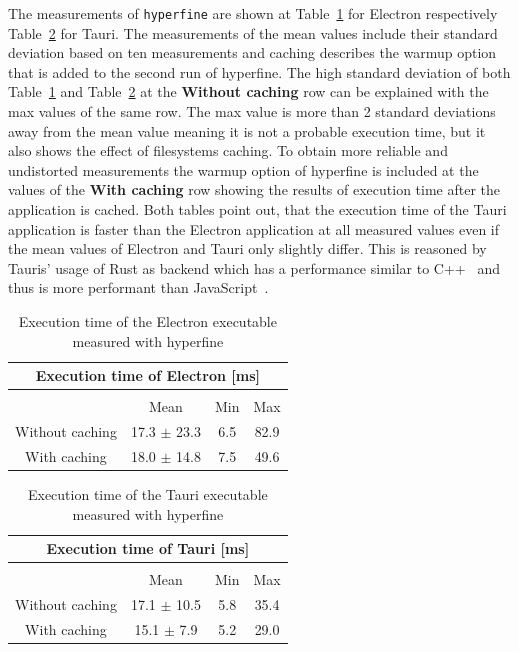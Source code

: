 The measurements of \texttt{hyperfine} are shown at Table~\ref{table:exec:electron} for Electron respectively Table~\ref{table:exec:tauri} for Tauri.
The measurements of the mean values include their standard deviation based on ten measurements and caching describes the warmup option that is added to the second run of hyperfine.
The high standard deviation of both Table~\ref{table:exec:electron} and Table~\ref{table:exec:tauri} at the \textbf{Without caching} row can be explained with the max values of the same row.
The max value is more than 2 standard deviations away from the mean value meaning it is not a probable execution time, but it also shows the effect of filesystems caching.
To obtain more reliable and undistorted measurements the warmup option of hyperfine is included at the values of the \textbf{With caching} row showing the results of execution time after the application is cached.
Both tables point out, that the execution time of the Tauri application is faster than the Electron application at all measured values even if the mean values of Electron and Tauri only slightly differ.
This is reasoned by Tauris' usage of Rust as backend which has a performance similar to C++~\cite{rustPerformance} and thus is more performant than JavaScript~\cite{C++Javascript}.

\begin{table}[h]
    \begin{tabular} {| c | c | c | c |}
        \hline
        \multicolumn{4}{|c|}{Execution time of Electron [ms]} \\ \hline
        \multicolumn{4}{|c|}{}\\ \hline
        & Mean   & Min & Max     \\ \hline
        Without caching & 17.3 $\pm$ 23.3 & 6.5 & 82.9  \\ \hline
        With caching & 18.0 $\pm$ 14.8 & 7.5 & 49.6 \\ \hline
    \end{tabular}
    \caption{\label{table:exec:electron} Execution time of the Electron executable measured with hyperfine}
\end{table}
\begin{table}[h]
    \begin{tabular} {| c | c | c | c |}
        \hline
        \multicolumn{4}{|c|}{Execution time of Tauri [ms]} \\ \hline
        \multicolumn{4}{|c|}{}\\ \hline
        & Mean & Min & Max     \\ \hline
        Without caching & 17.1 $\pm$ 10.5 & 5.8 & 35.4  \\ \hline
        With caching & 15.1 $\pm$ 7.9 & 5.2 & 29.0 \\ \hline
    \end{tabular}
    \caption{\label{table:exec:tauri} Execution time of the Tauri executable measured with hyperfine}
\end{table}

